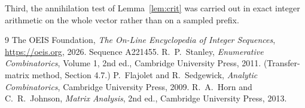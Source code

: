 \documentclass[11pt,a4paper]{article}
\theoremstyle{plain}
\theoremstyle{definition}
\begin{document}
Third, the annihilation test of Lemma~\ref{lem:crit} was carried out in exact integer
arithmetic on the whole vector rather than on a sampled prefix.

\begin{thebibliography}{9}
 The OEIS Foundation, \emph{The On-Line Encyclopedia of Integer
Sequences}, \url{https://oeis.org}, 2026. Sequence A221455.
 R.~P.~Stanley, \emph{Enumerative Combinatorics}, Volume 1, 2nd ed.,
Cambridge University Press, 2011. (Transfer-matrix method, Section 4.7.)
 P.~Flajolet and R.~Sedgewick, \emph{Analytic Combinatorics}, Cambridge
University Press, 2009.
 R.~A.~Horn and C.~R.~Johnson, \emph{Matrix Analysis}, 2nd ed., Cambridge
University Press, 2013.
\end{thebibliography}
\end{document}
